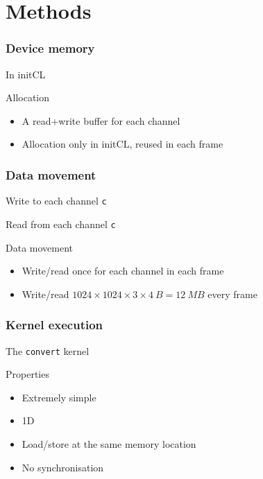 \section{Methods}
\begin{frame}
  \frametitle{Device memory}
   \pause{}
  \begin{block}{In initCL}
    
  \end{block}
  \pause{}
  \begin{alertblock}{Allocation}
    \begin{itemize}
    \item A read+write buffer for each channel
    \item Allocation only in initCL, reused in each frame
    \end{itemize}
  \end{alertblock}
\end{frame}

\begin{frame}
  \frametitle{Data movement}
  \pause{}
  \begin{block}{Write to each channel \lstinline{c}}
    
  \end{block}
  \pause{}
  \begin{block}{Read from each channel \lstinline{c}}
    
  \end{block}
  \pause{}
  \begin{alertblock}{Data movement}
    \begin{itemize}
    \item Write/read once for each channel in each frame
    \item Write/read
      \(1024 \times 1024 \times 3 \times 4~\mathit{B} = 12~\mathit{MB}\) every frame
    \end{itemize}
  \end{alertblock}
\end{frame}

\begin{frame}
  \frametitle{Kernel execution}
  \begin{block}{The \lstinline{convert} kernel}
    
  \end{block}
  \pause{}
  \begin{alertblock}{Properties}
    \begin{itemize}
    \item Extremely simple
    \item 1D
    \item Load/store at the same memory location
    \item No synchronisation
    \end{itemize}
  \end{alertblock}
\end{frame}


